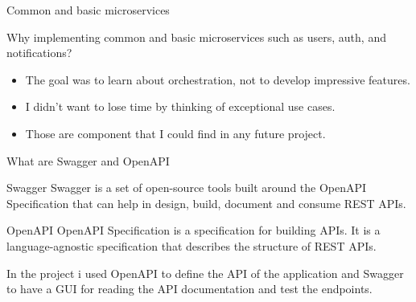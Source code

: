 \documentclass{beamer}
\begin{document}
\begin{frame}{Common and basic microservices}
	\label{common_ms}
	\begin{block}{}
		Why implementing common and basic microservices such as users, auth, and notifications?
	\end{block}
	\begin{itemize}
		\item The goal was to learn about orchestration, not to develop impressive features.
		\item I didn't want to lose time by thinking of exceptional use cases.
		\item Those are component that I could find in any future project.
	\end{itemize}
\hyperlink{index_1}{}
\end{frame}

\begin{frame}{What are Swagger and OpenAPI}
	\label{swagger_openapi}
	\begin{block}{Swagger}
		Swagger is a set of open-source tools built around the OpenAPI Specification that can help in design, build, document and consume REST APIs.
\end{block}
\begin{block}{OpenAPI}
		OpenAPI Specification is a specification for building APIs. It is a language-agnostic specification that describes the structure of REST APIs.
\end{block}
In the project i used OpenAPI to define the API of the application and Swagger to have a GUI for reading the API documentation and test the endpoints.
\newline
\hyperlink{index_1}{}
\end{frame}
\end{document}
